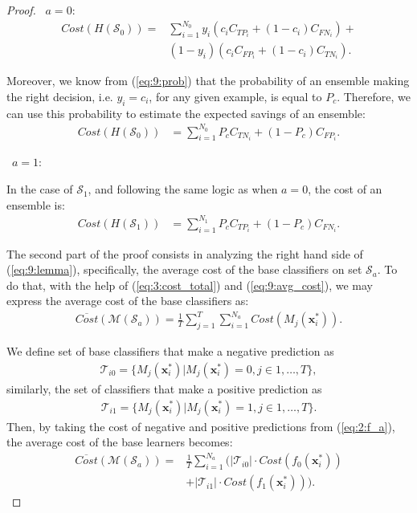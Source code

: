 {\begin{proof}
  \textbullet\ $a=0:$
  \begin{align}
  Cost(H(\mathcal{S}_0)) =& \sum_{i=1}^{N_0} y_i(c_i C_{TP_i} + (1-c_i)C_{FN_i})+ \nonumber \\  
    & (1-y_i)(c_i C_{FP_i} + (1-c_i)C_{TN_i}) . 
  \end{align}
  
  \noindent Moreover, we know from (\ref{eq:9:prob}) that the probability of an ensemble 
  making the right decision, i.e. $y_i=c_i$, for any given  example, is equal to $P_c$. 
  Therefore, we can use this probability to estimate the expected savings of an ensemble: 
  \begin{align}
    Cost(H(\mathcal{S}_0)) &= \sum_{i=1}^{N_0} P_c C_{TN_i} +(1-P_c)C_{FP_i}.
  \end{align}
  
  \textbullet\ $a=1:$
  
  \noindent In the case of $\mathcal{S}_1$, and following the same logic as when $a=0$, the cost of 
  an  ensemble is:
  \begin{align}
    Cost(H(\mathcal{S}_1)) &= \sum_{i=1}^{N_1} P_c C_{TP_i} + (1-P_c)C_{FN_i}.  
  \end{align}

  \noindent The second part of the proof consists in analyzing the right hand side of 
  (\ref{eq:9:lemma}),   specifically, the average cost of the base classifiers on set 
  $\mathcal{S}_a$. To do that, with the help of (\ref{eq:3:cost_total}) and (\ref{eq:9:avg_cost}), 
  we may express the average cost of the base classifiers as:
  \begin{align}
    \overline{Cost} (\mathcal{M}(\mathcal{S}_a)) = \frac{1}{T} \sum_{j=1}^{T} \sum_{i=1}^{N_a} 
    Cost(M_j(\mathbf{x}_i^*)).  
  \end{align} 
  
  \noindent We define set of base classifiers that make a negative prediction as
  \begin{align}
    \mathcal{T}_{i0}=\{M_j(\mathbf{x}_i^*) \vert M_j(\mathbf{x}_i^*) = 0, j \in 1,\dots,T\},
  \end{align}
  similarly, the set of classifiers that make a positive prediction as
  \begin{align}
    \mathcal{T}_{i1}=\{M_j(\mathbf{x}_i^*) \vert M_j(\mathbf{x}_i^*) = 1, j \in 1,\dots,T\}.
  \end{align}
  Then, by taking the cost of negative and positive predictions from (\ref{eq:2:f_a}), the 
  average cost of the base learners becomes:
  \begin{align}
    \overline{Cost} (\mathcal{M}(\mathcal{S}_a)) =& 
    \frac{1}{T} \sum_{i=1}^{N_a} \bigg( \vert \mathcal{T}_{i0} \vert \cdot 
    Cost(f_0(\mathbf{x}_i^*)) \nonumber \\
    & + \vert \mathcal{T}_{i1} \vert \cdot Cost(f_1(\mathbf{x}_i^*)) \bigg).
  \end{align} 


\end{proof}}
